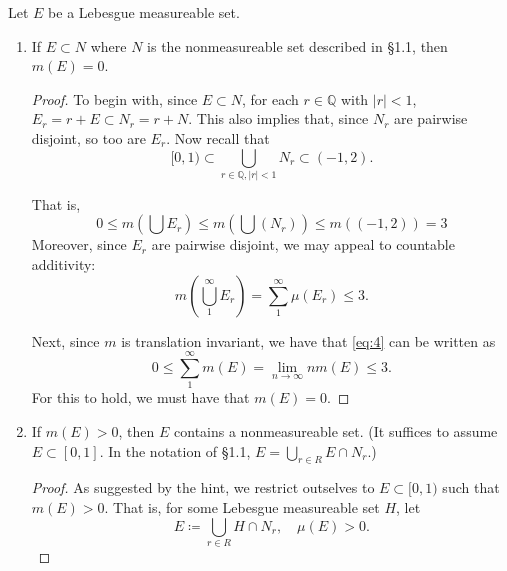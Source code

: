 \documentclass[12pt]{article}
\newenvironment{problem}[2][Problem]{\begin{trivlist}
    \item[\hskip \labelsep {\bfseries #1}\hskip \labelsep {\bfseries #2.}]}{\end{trivlist}}
\theoremstyle{definition}
\begin{document}
\begin{problem}{1.5.29}
  Let \( E \) be a Lebesgue measureable set.
  \begin{enumerate}[label=(\alph*)]
    \item If \( E \subset N \) where \( N \) is the nonmeasureable set described in \S 1.1, then \( m(E) = 0 \).
          \begin{proof}
            To begin with, since \( E \subset N \), for each \( r \in \mathbb{Q} \) with \( |r| < 1 \), \( E_r = r + E \subset N_{r} = r + N\).
            This also implies that, since \( N_r \) are pairwise disjoint, so too are \( E_r \).
            Now recall that
            \begin{equation}
            \label{eq:7}
            [0,1) \subset \bigcup_{r \in \mathbb{Q}, |r| < 1} N_r  \subset (-1, 2).
            \end{equation}

            That is,
            \begin{equation}
            0 \leq m(\bigcup E_r) \leq m(\bigcup (N_r)) \leq m((-1,2)) = 3
            \end{equation}
            Moreover, since \( E_r \) are pairwise disjoint, we may appeal to countable additivity:
            \begin{equation}
            \label{eq:4}
            m(\bigcup_1^{\infty} E_r) = \sum\limits_1^{\infty} \mu(E_r) \leq 3.
            \end{equation}

            Next, since \( m \) is translation invariant, we have that \cref{eq:4} can be written as
            \begin{equation}
            \label{eq:8}
            0 \leq \sum\limits_1^{\infty} m(E) = \lim_{n \rightarrow \infty} nm(E) \leq 3.
            \end{equation}
            For this to hold, we must have that \( m(E) = 0 \).
          \end{proof}
    \item If \( m(E) > 0 \), then \( E \) contains a nonmeasureable set.
          (It suffices to assume \( E \subset [0,1] \). In the notation of \S 1.1, \( E = \bigcup_{r \in R} E \cap N_r \).)
          \begin{proof}
            As suggested by the hint, we restrict outselves to \( E \subset [0,1) \) such that \( m(E) > 0 \).
            That is, for some Lebesgue measureable set \( H \), let
            \begin{equation}
            \label{eq:9}
            E \coloneq \bigcup_{r \in R} H \cap N_r, \quad \mu(E) > 0.
          \end{equation}


\end{proof}
\end{enumerate}
\end{problem}
\end{document}
